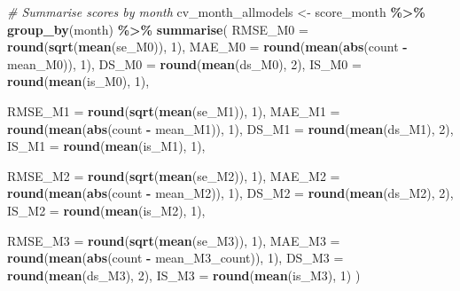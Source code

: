 \documentclass[
]{article}
\newenvironment{Shaded}{\begin{snugshade}}{\end{snugshade}}
\newcommand{\AttributeTok}[1]{\textcolor[rgb]{0.13,0.29,0.53}{#1}}
\newcommand{\CommentTok}[1]{\textcolor[rgb]{0.56,0.35,0.01}{\textit{#1}}}
\newcommand{\DecValTok}[1]{\textcolor[rgb]{0.00,0.00,0.81}{#1}}
\newcommand{\FunctionTok}[1]{\textcolor[rgb]{0.13,0.29,0.53}{\textbf{#1}}}
\newcommand{\NormalTok}[1]{#1}
\newcommand{\OtherTok}[1]{\textcolor[rgb]{0.56,0.35,0.01}{#1}}
\newcommand{\SpecialCharTok}[1]{\textcolor[rgb]{0.81,0.36,0.00}{\textbf{#1}}}
\begin{document}
\begin{Shaded}
\begin{Highlighting}[]
\CommentTok{\# Summarise scores by month}
\NormalTok{cv\_month\_allmodels }\OtherTok{\textless{}{-}}\NormalTok{ score\_month }\SpecialCharTok{\%\textgreater{}\%}
  \FunctionTok{group\_by}\NormalTok{(month) }\SpecialCharTok{\%\textgreater{}\%}
  \FunctionTok{summarise}\NormalTok{(}
    \AttributeTok{RMSE\_M0 =} \FunctionTok{round}\NormalTok{(}\FunctionTok{sqrt}\NormalTok{(}\FunctionTok{mean}\NormalTok{(se\_M0)), }\DecValTok{1}\NormalTok{),}
    \AttributeTok{MAE\_M0  =} \FunctionTok{round}\NormalTok{(}\FunctionTok{mean}\NormalTok{(}\FunctionTok{abs}\NormalTok{(count }\SpecialCharTok{{-}}\NormalTok{ mean\_M0)), }\DecValTok{1}\NormalTok{),}
    \AttributeTok{DS\_M0   =} \FunctionTok{round}\NormalTok{(}\FunctionTok{mean}\NormalTok{(ds\_M0), }\DecValTok{2}\NormalTok{),}
    \AttributeTok{IS\_M0   =} \FunctionTok{round}\NormalTok{(}\FunctionTok{mean}\NormalTok{(is\_M0), }\DecValTok{1}\NormalTok{),}
    
    \AttributeTok{RMSE\_M1 =} \FunctionTok{round}\NormalTok{(}\FunctionTok{sqrt}\NormalTok{(}\FunctionTok{mean}\NormalTok{(se\_M1)), }\DecValTok{1}\NormalTok{),}
    \AttributeTok{MAE\_M1  =} \FunctionTok{round}\NormalTok{(}\FunctionTok{mean}\NormalTok{(}\FunctionTok{abs}\NormalTok{(count }\SpecialCharTok{{-}}\NormalTok{ mean\_M1)), }\DecValTok{1}\NormalTok{),}
    \AttributeTok{DS\_M1   =} \FunctionTok{round}\NormalTok{(}\FunctionTok{mean}\NormalTok{(ds\_M1), }\DecValTok{2}\NormalTok{),}
    \AttributeTok{IS\_M1   =} \FunctionTok{round}\NormalTok{(}\FunctionTok{mean}\NormalTok{(is\_M1), }\DecValTok{1}\NormalTok{),}
    
    \AttributeTok{RMSE\_M2 =} \FunctionTok{round}\NormalTok{(}\FunctionTok{sqrt}\NormalTok{(}\FunctionTok{mean}\NormalTok{(se\_M2)), }\DecValTok{1}\NormalTok{),}
    \AttributeTok{MAE\_M2  =} \FunctionTok{round}\NormalTok{(}\FunctionTok{mean}\NormalTok{(}\FunctionTok{abs}\NormalTok{(count }\SpecialCharTok{{-}}\NormalTok{ mean\_M2)), }\DecValTok{1}\NormalTok{),}
    \AttributeTok{DS\_M2   =} \FunctionTok{round}\NormalTok{(}\FunctionTok{mean}\NormalTok{(ds\_M2), }\DecValTok{2}\NormalTok{),}
    \AttributeTok{IS\_M2   =} \FunctionTok{round}\NormalTok{(}\FunctionTok{mean}\NormalTok{(is\_M2), }\DecValTok{1}\NormalTok{),}
    
    \AttributeTok{RMSE\_M3 =} \FunctionTok{round}\NormalTok{(}\FunctionTok{sqrt}\NormalTok{(}\FunctionTok{mean}\NormalTok{(se\_M3)), }\DecValTok{1}\NormalTok{),}
    \AttributeTok{MAE\_M3  =} \FunctionTok{round}\NormalTok{(}\FunctionTok{mean}\NormalTok{(}\FunctionTok{abs}\NormalTok{(count }\SpecialCharTok{{-}}\NormalTok{ mean\_M3\_count)), }\DecValTok{1}\NormalTok{),}
    \AttributeTok{DS\_M3   =} \FunctionTok{round}\NormalTok{(}\FunctionTok{mean}\NormalTok{(ds\_M3), }\DecValTok{2}\NormalTok{),}
    \AttributeTok{IS\_M3   =} \FunctionTok{round}\NormalTok{(}\FunctionTok{mean}\NormalTok{(is\_M3), }\DecValTok{1}\NormalTok{)}
\NormalTok{  )}


\end{Highlighting}
\end{Shaded}
\end{document}
